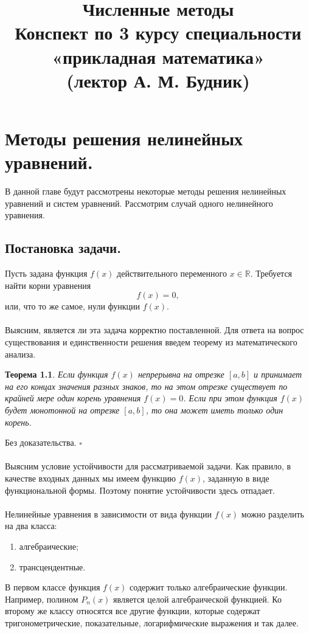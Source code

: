 \documentclass[a4paper, 12pt]{report}
\title{\textbf{\Huge{Численные методы}}\\Конспект по 3 курсу 
	специальности «прикладная математика»\\(лектор А. М. Будник)}
\date{}
\numberwithin{equation}{section}
\newenvironment{Proof} %
{\par\noindent{$\blacklozenge$}} %
{\hfill$\scriptstyle\square$}
\newcommand{\Rm}{\mathbb{R}}
\newtheorem*{theorem}{Теорема}
\begin{document}
	\maketitle
	\tableofcontents{}
	\newpage
	\chapter{Методы решения нелинейных уравнений.}
	В данной главе будут рассмотрены некоторые методы решения нелинейных уравнений и систем уравнений. Рассмотрим случай одного нелинейного уравнения.
	\section{Постановка задачи.}
	Пусть задана функция $f(x)$ действительного переменного $x \in \Rm$. Требуется найти корни уравнения 
	\begin{equation}
		f(x) = 0,
	\end{equation}
	или, что то же самое, нули функции $f(x)$. \\\\
	Выясним, является ли эта задача корректно поставленной. Для ответа на вопрос существования и единственности решения введем теорему из математического анализа.
	\begin{theorem}
		Если функция $f(x)$ непрерывна на отрезке $[a,b]$ и принимает на его концах значения разных знаков, то на этом отрезке существует по крайней мере один корень уравнения $f(x) = 0$.
		Если при этом функция $f(x)$ будет монотонной на отрезке $[a,b]$, то она может иметь только один корень.
	\end{theorem}
	\begin{Proof}
		Без доказательства.
	\end{Proof}\\\\
	Выясним условие устойчивости для рассматриваемой задачи. Как правило, в качестве входных данных мы имеем функцию $f(x)$, заданную в виде функциональной формы. Поэтому понятие устойчивости здесь отпадает.
	\\\\
	Нелинейные уравнения в зависимости от вида функции $f(x)$ можно разделить на два класса:
	\begin{enumerate}
		\item алгебраические;
		\item трансцендентные.
	\end{enumerate}
	В первом классе функция $f(x)$ содержит только алгебраические функции. Например, полином $P_n(x)$ является целой алгебраической функцией. Ко второму же классу относятся все другие функции, которые содержат тригонометрические, показательные, логарифмические выражения и так далее.\\\\
\end{document}
